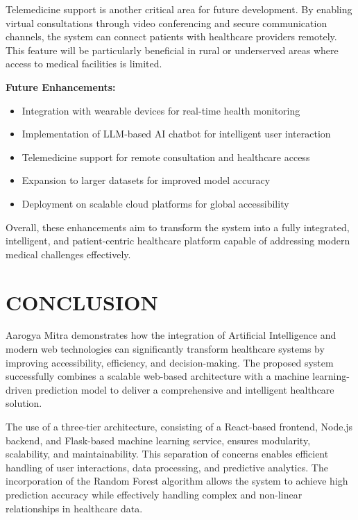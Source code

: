 \documentclass[conference]{IEEEtran}
\begin{document}
Telemedicine support is another critical area for future development. By enabling virtual consultations through video conferencing and secure communication channels, the system can connect patients with healthcare providers remotely. This feature will be particularly beneficial in rural or underserved areas where access to medical facilities is limited.

\textbf{Future Enhancements:}
\begin{itemize}
\item Integration with wearable devices for real-time health monitoring
\item Implementation of LLM-based AI chatbot for intelligent user interaction
\item Telemedicine support for remote consultation and healthcare access
\item Expansion to larger datasets for improved model accuracy
\item Deployment on scalable cloud platforms for global accessibility
\end{itemize}

Overall, these enhancements aim to transform the system into a fully integrated, intelligent, and patient-centric healthcare platform capable of addressing modern medical challenges effectively.
 
\section{CONCLUSION}

Aarogya Mitra demonstrates how the integration of Artificial Intelligence and modern web technologies can significantly transform healthcare systems by improving accessibility, efficiency, and decision-making. The proposed system successfully combines a scalable web-based architecture with a machine learning-driven prediction model to deliver a comprehensive and intelligent healthcare solution.

The use of a three-tier architecture, consisting of a React-based frontend, Node.js backend, and Flask-based machine learning service, ensures modularity, scalability, and maintainability. This separation of concerns enables efficient handling of user interactions, data processing, and predictive analytics. The incorporation of the Random Forest algorithm allows the system to achieve high prediction accuracy while effectively handling complex and non-linear relationships in healthcare data.
\end{document}
